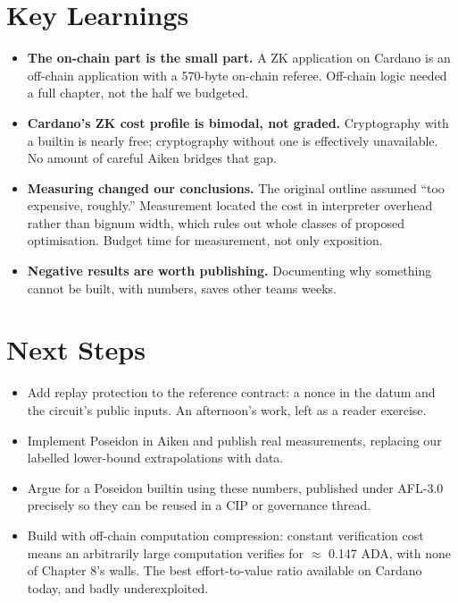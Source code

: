 \documentclass[10pt,a4paper]{article}
\begin{document}
\section{Key Learnings}

\begin{itemize}
  \item \textbf{The on-chain part is the small part.} A ZK application on
        Cardano is an off-chain application with a 570-byte on-chain referee.
        Off-chain logic needed a full chapter, not the half we budgeted.
  \item \textbf{Cardano's ZK cost profile is bimodal, not graded.} Cryptography
        with a builtin is nearly free; cryptography without one is effectively
        unavailable. No amount of careful Aiken bridges that gap.
  \item \textbf{Measuring changed our conclusions.} The original outline assumed
        ``too expensive, roughly.'' Measurement located the cost in interpreter
        overhead rather than bignum width, which rules out whole classes of
        proposed optimisation. Budget time for measurement, not only exposition.
  \item \textbf{Negative results are worth publishing.} Documenting why
        something cannot be built, with numbers, saves other teams weeks.
\end{itemize}

\section{Next Steps}

\begin{itemize}
  \item Add replay protection to the reference contract: a nonce in the datum
        and the circuit's public inputs. An afternoon's work, left as a reader
        exercise.
  \item Implement Poseidon in Aiken and publish real measurements, replacing our
        labelled lower-bound extrapolations with data.
  \item Argue for a Poseidon builtin using these numbers, published under
        AFL-3.0 precisely so they can be reused in a CIP or governance thread.
  \item Build with off-chain computation compression: constant verification cost
        means an arbitrarily large computation verifies for $\approx$ 0.147 ADA,
        with none of Chapter 8's walls. The best effort-to-value ratio available
        on Cardano today, and badly underexploited.
\end{itemize}
\end{document}
